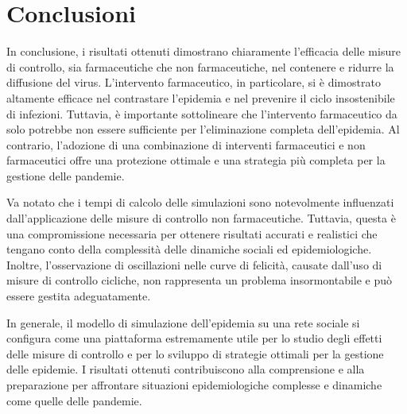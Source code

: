 \section{Conclusioni}

In conclusione, i risultati ottenuti dimostrano chiaramente 
l'efficacia delle misure di controllo, sia farmaceutiche che non 
farmaceutiche, nel contenere e ridurre la diffusione del virus. 
L'intervento farmaceutico, in particolare, si è dimostrato altamente 
efficace nel contrastare l'epidemia e nel prevenire il ciclo 
insostenibile di infezioni. Tuttavia, è importante sottolineare che 
l'intervento farmaceutico da solo potrebbe non essere sufficiente per 
l'eliminazione completa dell'epidemia. Al contrario, l'adozione di una 
combinazione di interventi farmaceutici e non farmaceutici offre una 
protezione ottimale e una strategia più completa per la gestione delle 
pandemie.

Va notato che i tempi di calcolo delle simulazioni sono notevolmente 
influenzati dall'applicazione delle misure di controllo non farmaceutiche. 
Tuttavia, questa è una compromissione necessaria per ottenere risultati 
accurati e realistici che tengano conto della complessità delle dinamiche 
sociali ed epidemiologiche. Inoltre, l'osservazione di oscillazioni 
nelle curve di felicità, causate dall'uso di misure di controllo cicliche, 
non rappresenta un problema insormontabile e può essere gestita 
adeguatamente.

In generale, il modello di simulazione dell'epidemia su una rete sociale 
si configura come una piattaforma estremamente utile per lo studio degli 
effetti delle misure di controllo e per lo sviluppo di strategie ottimali 
per la gestione delle epidemie. I risultati ottenuti contribuiscono alla 
comprensione e alla preparazione per affrontare situazioni 
epidemiologiche complesse e dinamiche come quelle delle pandemie.